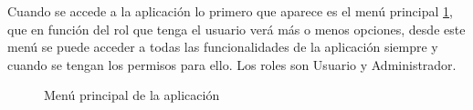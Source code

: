 Cuando se accede a la aplicación lo primero que aparece es el menú principal \ref{fig:vista_principal}, que en función del rol que tenga el usuario verá más o menos opciones, desde este menú se puede acceder a todas las funcionalidades de la aplicación siempre y cuando se tengan los permisos para ello. Los roles son Usuario y Administrador.

\begin{figure}[H]
    \centering
    \caption{Menú principal de la aplicación}
    \label{fig:vista_principal}
\end{figure}


